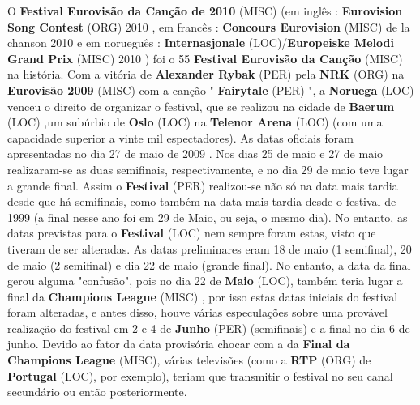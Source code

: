 \documentclass[12pt,a4paper]{article}
\begin{document}
O \textbf{Festival Eurovisão da Canção de 2010} (MISC) (em inglês : \textbf{Eurovision Song Contest} (ORG) 2010 , em francês : \textbf{Concours Eurovision} (MISC) de la chanson 2010 e em norueguês : \textbf{Internasjonale} (LOC)/\textbf{Europeiske Melodi Grand Prix} (MISC) 2010 ) foi o 55 \textbf{Festival Eurovisão da Canção} (MISC) na história. Com a vitória de \textbf{Alexander Rybak} (PER) pela \textbf{NRK} (ORG) na \textbf{Eurovisão 2009} (MISC) com a canção " \textbf{Fairytale} (PER) ", a \textbf{Noruega} (LOC) venceu o direito de organizar o festival, que se realizou na cidade de \textbf{Baerum} (LOC) ,um subúrbio de \textbf{Oslo} (LOC) na \textbf{Telenor Arena} (LOC) (com uma capacidade superior a vinte mil espectadores). As datas oficiais foram apresentadas no dia 27 de maio de 2009 . Nos dias 25 de maio e 27 de maio realizaram-se as duas semifinais, respectivamente, e no dia 29 de maio teve lugar a grande final. Assim o \textbf{Festival} (PER) realizou-se não só na data mais tardia desde que há semifinais, como também na data mais tardia desde o festival de 1999 (a final nesse ano foi em 29 de Maio, ou seja, o mesmo dia). No entanto, as datas previstas para o \textbf{Festival} (LOC) nem sempre foram estas, visto que tiveram de ser alteradas. As datas preliminares eram 18 de maio (1 semifinal), 20 de maio (2 semifinal) e dia 22 de maio (grande final). No entanto, a data da final gerou alguma "confusão", pois no dia 22 de \textbf{Maio} (LOC), também teria lugar a final da \textbf{Champions League} (MISC) , por isso estas datas iniciais do festival foram alteradas, e antes disso, houve várias especulações sobre uma provável realização do festival em 2 e 4 de \textbf{Junho} (PER) (semifinais) e a final no dia 6 de junho. Devido ao fator da data provisória chocar com a da \textbf{Final da Champions League} (MISC), várias televisões (como a \textbf{RTP} (ORG) de \textbf{Portugal} (LOC), por exemplo), teriam que transmitir o festival no seu canal secundário ou então posteriormente.
\end{document}
